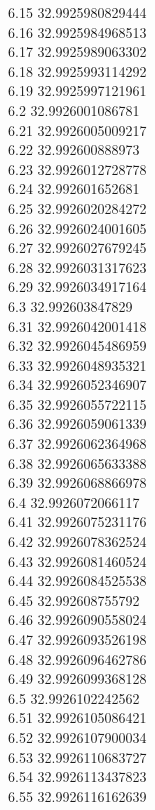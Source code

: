 {6.15	32.9925980829444\\
6.16	32.9925984968513\\
6.17	32.9925989063302\\
6.18	32.9925993114292\\
6.19	32.9925997121961\\
6.2	32.9926001086781\\
6.21	32.9926005009217\\
6.22	32.992600888973\\
6.23	32.9926012728778\\
6.24	32.992601652681\\
6.25	32.9926020284272\\
6.26	32.9926024001605\\
6.27	32.9926027679245\\
6.28	32.9926031317623\\
6.29	32.9926034917164\\
6.3	32.992603847829\\
6.31	32.9926042001418\\
6.32	32.9926045486959\\
6.33	32.9926048935321\\
6.34	32.9926052346907\\
6.35	32.9926055722115\\
6.36	32.9926059061339\\
6.37	32.9926062364968\\
6.38	32.9926065633388\\
6.39	32.9926068866978\\
6.4	32.9926072066117\\
6.41	32.9926075231176\\
6.42	32.9926078362524\\
6.43	32.9926081460524\\
6.44	32.9926084525538\\
6.45	32.992608755792\\
6.46	32.9926090558024\\
6.47	32.9926093526198\\
6.48	32.9926096462786\\
6.49	32.9926099368128\\
6.5	32.9926102242562\\
6.51	32.9926105086421\\
6.52	32.9926107900034\\
6.53	32.9926110683727\\
6.54	32.9926113437823\\
6.55	32.9926116162639\\
}
